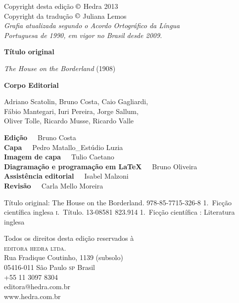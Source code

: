 
\begingroup
\parindent0mm\parskip0mm
\footnotesize
\thispagestyle{empty}

Copyright desta edição $\copyright$ Hedra 2013\\
Copyright da tradução $\copyright$ Juliana Lemos\\


{\itshape
Grafia atualizada segundo o Acordo Ortográfico da Língua\\
Portuguesa de 1990, em vigor no Brasil desde 2009. 
}\medskip

\textbf{Título original}\smallskip

\textit{The House on the Borderland} (1908)\smallskip

\medskip

\textbf{Corpo Editorial}\smallskip

Adriano Scatolin,
Bruno Costa,
Caio Gagliardi,\\
Fábio Mantegari,
Iuri Pereira,
Jorge Sallum,\\
Oliver Tolle,
Ricardo Musse,
Ricardo Valle\medskip

\textbf{Edição}\ \ \  Bruno Costa\\
\textbf{Capa}\ \ \  Pedro Matallo\_Estúdio Luzia\\
\textbf{Imagem de capa}\ \ \ Tulio Caetano\\
\textbf{Diagramação e programação em \LaTeX}\ \ \  Bruno Oliveira\\
\textbf{Assistência editorial}\ \ \  Isabel Malzoni\\
\textbf{Revisão}\ \ \ Carla Mello Moreira

% 
{Título original: The House on the Borderland.}
{978-85-7715-326-8}%
{1.~Ficção científica inglesa \textsc{i}.~Título.}%
{13-08581}%
{823.914}%
{1.~Ficção científica : Literatura inglesa}%


Todos os direitos desta edição reservados à\\
\textsc{editora hedra ltda.}\\
Rua Fradique Coutinho, 1139 (subsolo)\\
05416-011 São Paulo \textsc{sp} Brasil\\
+55 11 3097 8304\\
editora@hedra.com.br\\
www.hedra.com.br
\endgroup

\clearpage 
